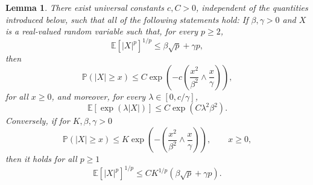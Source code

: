 \documentclass[a4paper,12pt]{article}
\newtheorem{lemma}[theorem]{Lemma}
\begin{document}
\begin{lemma}
  \label{lem:tail-estimate}
  There exist universal constants $c,C>0$, independent of the quantities introduced below, such that all of the following statements hold: If $\beta, \gamma > 0$ and $X$ is a real-valued random variable such that, for every $p\ge 2$,
  \[ \mathbb{E} [| X |^p]^{1 / p} \leq \beta \sqrt{p} + \gamma p,
  \]
  then
  \[ \mathbb{P} (| X | \geq x) \leq C \exp \left( - c
     \left( \frac{x^2}{\beta^2} \wedge \frac{x}{\gamma} \right) \right),
  \]
  for all $x \geq 0$, and moreover,  for every $\lambda \in [0, c / \gamma]$, 
  \[ \mathbb{E} [\exp (\lambda | X |)] \leq C \exp ( C \lambda^2 \beta^2) . \]
  Conversely, if for $K,\beta,\gamma>0$
  \[
    \mathbb P(|X|\geq x) \leq K \exp \left( - \left( \frac{x^2}{\beta^2} \wedge \frac{x}{\gamma} \right) \right),\qquad x \geq 0,
  \]
  then it holds for all $p\geq 1$
  \[
    \mathbb{E} [| X |^p]^{1 / p} \leq CK^{1/p} (\beta \sqrt{p} + \gamma p).
  \]
\end{lemma}
\end{document}
